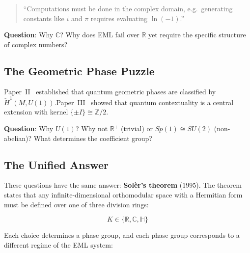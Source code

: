\documentclass[11pt]{article}
\begin{document}
\begin{quote}
``Computations must be done in the complex domain, e.g.~generating constants like \(i\) and \(\pi\) requires evaluating \(\ln(-1)\).''
\end{quote}

\textbf{Question}: Why $\mathbb{C}$? Why does EML fail over $\mathbb{R}$ yet require the specific structure of complex numbers?

\subsection{The Geometric Phase Puzzle}
\label{the-geometric-phase-puzzle}

Paper~II~\cite{PaperII} established that quantum geometric phases are classified by $\check{H}^1(M, U(1))$.\linebreak Paper~III~\cite{PaperIII} showed that quantum contextuality is a central extension with kernel $\{\pm I\} \cong \mathbb{Z}/2$.

\textbf{Question}: Why \(U(1)\)? Why not \(\mathbb{R}^+\) (trivial) or \(Sp(1) \cong SU(2)\) (non-abelian)? What determines the coefficient group?

\subsection{The Unified Answer}
\label{the-unified-answer}

These questions have the same answer: \textbf{Solèr's theorem} (1995). The theorem states that any infinite-dimensional orthomodular space with a Hermitian form must be defined over one of three division rings:

\[K \in \{\mathbb{R}, \mathbb{C}, \mathbb{H}\}\]

Each choice determines a phase group, and each phase group corresponds to a different regime of the EML system:
\end{document}
